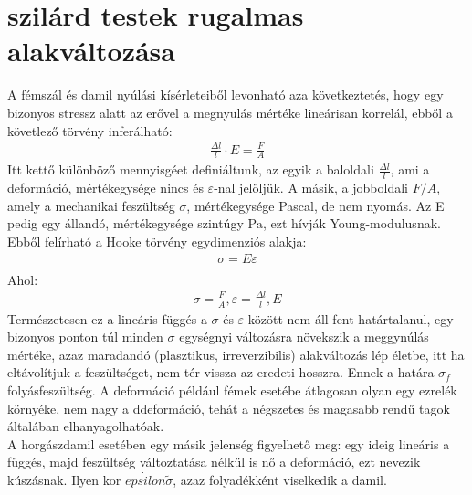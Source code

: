 \documentclass{article}
\begin{document}
\section{szilárd testek rugalmas alakváltozása}
A fémszál és damil nyúlási kísérleteiből levonható aza következtetés, hogy egy bizonyos stressz alatt az erővel a megnyulás mértéke lineárisan korrelál, ebből a követlező törvény inferálható:
\begin{align*}
\frac{\Delta l}{l} \cdot E = \frac{F}{A} 
\end{align*}
Itt kettő különböző mennyisgéet definiáltunk, az egyik a baloldali $\frac{\Delta l }{l }$, ami a deformáció, mértékegysége nincs és $\varepsilon$-nal jelöljük. A másik, a jobboldali $F/A$, amely a mechanikai feszültség $\sigma$, mértékegysége Pascal, de nem nyomás. Az E pedig egy állandó, mértékegysége szintúgy $\mathrm{Pa}$, ezt hívják Young-modulusnak. Ebből felírható a Hooke törvény egydimenziós alakja:
\begin{align*}
\sigma = E \varepsilon \\
\end{align*}
Ahol: 
\begin{align*}
\sigma = \frac{F}{A}, \varepsilon = \frac{\Delta l}{l}, E
\end{align*}
Természetesen ez a lineáris függés a $\sigma$ és $\varepsilon$ között nem áll fent határtalanul, egy bizonyos ponton túl minden $\sigma$ egységnyi változásra növekszik a meggynúlás mértéke, azaz maradandó (plasztikus, irreverzibilis) alakváltozás lép életbe, itt ha eltávolítjuk a feszültséget, nem tér vissza az eredeti hosszra. Ennek a határa $\sigma_f$ folyásfeszültség. A deformáció például fémek esetébe átlagosan olyan egy ezrelék környéke, nem nagy a ddeformáció, tehát a négszetes és magasabb rendű tagok általában elhanyagolhatóak.\\
A horgászdamil esetében egy másik jelenség figyelhető meg: egy ideig lineáris a függés, majd feszültség változtatása nélkül is nő a deformáció, ezt nevezik kúszásnak. Ilyen kor $\dot{epsilon} \tilde \sigma$, azaz folyadékként viselkedik a damil.
\end{document}
